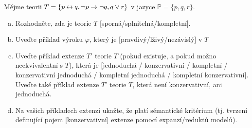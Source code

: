 \begin{problem}\label{problem:properties-of-theories}

    Mějme teorii $T=\{p\mathbin{\leftrightarrow} q,\neg p\to\neg q,q\lor r\}$ v jazyce $\mathbb P=\{p,q,r\}$.
    \begin{enumerate}[(a)]
        \item Rozhodněte, zda je teorie $T$ [sporná/splnitelná/kompletní].
        \item Uveďte příklad výroku $\varphi$, který je [pravdivý/lživý/nezávislý] v $T$
        \item Uveďte příklad extenze $T'$ teorie $T$ (pokud existuje, a pokud možno neekvivalentní s $T$), která je [jednoduchá / konzervativní / kompletní / konzervativní jednoduchá / kompletní jednoduchá / kompletní konzervativní]. Uveďte také příklad extenze $T'$ teorie $T$, která není konzervativní, ani jednoduchá.
        \item Na vašich příkladech extenzí ukažte, že platí sémantické kritérium (tj. tvrzení definující pojem [konzervativní] extenze pomocí expanzí/reduktů modelů).
    \end{enumerate}


\end{problem}
